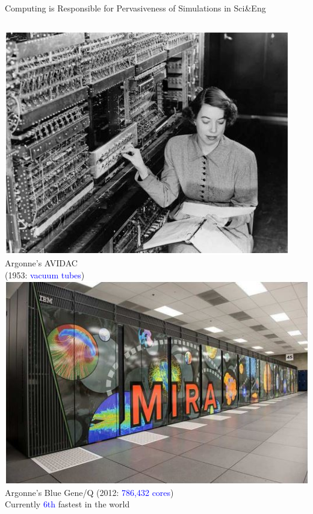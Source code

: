 \documentclass[handout,aspectratio=54]{beamer}
\numberwithin{theorem}{section}
\begin{document}
\begin{frame}{Computing is Responsible for Pervasiveness of Simulations in Sci\&Eng}
\begin{columns}
\includegraphics[width=\textwidth]{fig/3-1.jpg}
{
\scriptsize
Argonne’s AVIDAC\\
(1953: \textcolor{blue}{vacuum tubes})
}
\includegraphics[width=\textwidth]{fig/3-2.jpg}
{
\scriptsize
Argonne’s Blue Gene/Q (2012: \textcolor{blue}{786,432 cores})\\
Currently \textcolor{blue}{6th} fastest in the world
}

\end{columns}
\end{frame}
\end{document}

